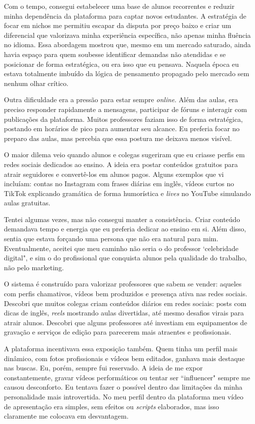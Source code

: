 \documentclass[portuguese]{textolivre}
\begin{document}
Com o tempo, consegui estabelecer uma base de alunos recorrentes e reduzir minha dependência da plataforma para captar novos estudantes. A estratégia de focar em nichos me permitiu escapar da disputa por preço baixo e criar um diferencial que valorizava minha experiência específica, não apenas minha fluência no idioma. Essa abordagem mostrou que, mesmo em um mercado saturado, ainda havia espaço para quem soubesse identificar demandas não atendidas e se posicionar de forma estratégica, ou era isso que eu pensava. Naquela época eu estava totalmente imbuído da lógica de pensamento propagado pelo mercado sem nenhum olhar crítico.

Outra dificuldade era a pressão para estar sempre \textit{online}. Além das aulas, era preciso responder rapidamente a mensagens, participar de fóruns e interagir com publicações da plataforma. Muitos professores faziam isso de forma estratégica, postando em horários de pico para aumentar seu alcance. Eu preferia focar no preparo das aulas, mas percebia que essa postura me deixava menos visível.

O maior dilema veio quando alunos e colegas sugeriram que eu criasse perfis em redes sociais dedicados ao ensino. A ideia era postar conteúdos gratuitos para atrair seguidores e convertê-los em alunos pagos. Alguns exemplos que vi incluíam: contas no Instagram com frases diárias em inglês, vídeos curtos no TikTok explicando gramática de forma humorística e \textit{lives} no YouTube simulando aulas gratuitas.

Tentei algumas vezes, mas não consegui manter a consistência. Criar conteúdo demandava tempo e energia que eu preferia dedicar ao ensino em si. Além disso, sentia que estava forçando uma persona que não era natural para mim. Eventualmente, aceitei que meu caminho não seria o do professor `celebridade digital", e sim o do profissional que conquista alunos pela qualidade do trabalho, não pelo marketing.

O sistema é construído para valorizar professores que sabem se vender: aqueles com perfis chamativos, vídeos bem produzidos e presença ativa nas redes sociais. Descobri que muitos colegas criam conteúdos diários em redes sociais: posts com dicas de inglês, \textit{reels} mostrando aulas divertidas, até mesmo desafios virais para atrair alunos. Descobri que alguns professores até investiam em equipamentos de gravação e serviços de edição para parecerem mais atraentes e profissionais.

A plataforma incentivava essa exposição também. Quem tinha um perfil mais dinâmico, com fotos profissionais e vídeos bem editados, ganhava mais destaque nas buscas. Eu, porém, sempre fui reservado. A ideia de me expor constantemente, gravar vídeos performáticos ou tentar ser ``influencer" sempre me causou desconforto. Eu tentava fazer o possível dentro das limitações da minha personalidade mais introvertida. No meu perfil dentro da plataforma meu vídeo de apresentação era simples, sem efeitos ou \textit{scripts} elaborados, mas isso claramente me colocava em desvantagem.
\end{document}
